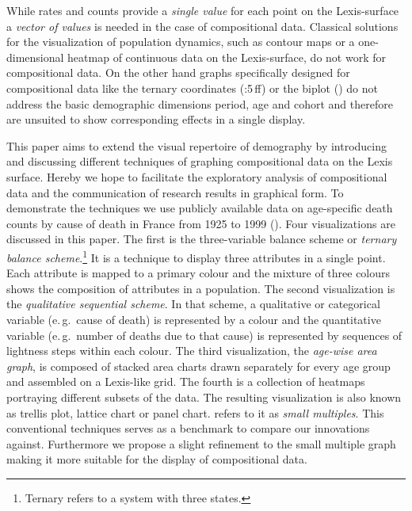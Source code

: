\documentclass[a4paper]{scrartcl}
\begin{document}
While rates and counts provide a \emph{single value} for each point on the Lexis-surface a \emph{vector of values} is needed in the case of compositional data. Classical solutions for the visualization of population dynamics, such as contour maps or a one-dimensional heatmap of continuous data on the Lexis-surface, do not work for compositional data. On the other hand graphs specifically designed for compositional data like the ternary coordinates (\cite{Aitchison1986}:5\,ff) or the biplot (\cite{Gabriel1971, Aitchison2002}) do not address the basic demographic dimensions period, age and cohort and therefore are unsuited to show corresponding effects in a single display.

This paper aims to extend the visual repertoire of demography by introducing and discussing different techniques of graphing compositional data on the Lexis surface. Hereby we hope to facilitate the exploratory analysis of compositional data and the communication of research results in graphical form. To demonstrate the techniques we use publicly available data on age-specific death counts by cause of death in France from 1925 to 1999 (\cite{Vallin2014}). Four visualizations are discussed in this paper. The first is the three-variable balance scheme or \emph{ternary balance scheme}.\footnote{Ternary refers to a system with three states.} It is a technique to display three attributes in a single point. Each attribute is mapped to a primary colour and the mixture of three colours shows the composition of attributes in a population. The second visualization is the \emph{qualitative sequential scheme}. In that scheme, a qualitative or categorical variable (e.\,g.~cause of death) is represented by a colour and the quantitative variable (e.\,g.~number of deaths due to that cause) is represented by sequences of lightness steps within each colour. The third visualization, the \emph{age-wise area graph}, is composed of stacked area charts drawn separately for every age group and assembled on a Lexis-like grid. The fourth is a collection of heatmaps portraying different subsets of the data. The resulting visualization is also known as trellis plot, lattice chart or panel chart. \textcite{Tufte1990} refers to it as \emph{small multiples}. This conventional techniques serves as a benchmark to compare our innovations against. Furthermore we propose a slight refinement to the small multiple graph making it more suitable for the display of compositional data.
\end{document}

